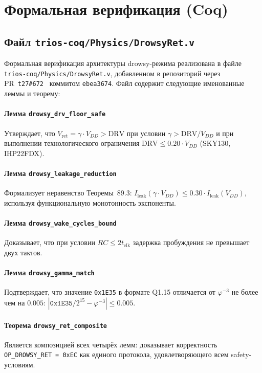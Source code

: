 \section{Формальная верификация (Coq)}
\label{sec:glava89-coq}

\subsection{Файл \texttt{trios-coq/Physics/DrowsyRet.v}}

Формальная верификация архитектуры drowsy-режима
реализована в файле \texttt{trios-coq/Physics/DrowsyRet.v},
добавленном в репозиторий через PR~\texttt{t27\#672}~\cite{t27-672}
коммитом \texttt{ebea3674}.
Файл содержит следующие именованные леммы и теорему:

\paragraph{Лемма \texttt{drowsy\_drv\_floor\_safe}}
Утверждает, что $V_\mathrm{ret} = \gamma \cdot V_{DD} > \mathrm{DRV}$
при условии $\gamma > \mathrm{DRV}/V_{DD}$
и при выполнении технологического ограничения
$\mathrm{DRV} \leq 0.20 \cdot V_{DD}$ (SKY130, IHP22FDX).

\paragraph{Лемма \texttt{drowsy\_leakage\_reduction}}
Формализует неравенство Теоремы~89.3:
$I_\mathrm{leak}(\gamma \cdot V_{DD}) \leq 0.30 \cdot I_\mathrm{leak}(V_{DD})$,
используя функциональную монотонность экспоненты.

\paragraph{Лемма \texttt{drowsy\_wake\_cycles\_bound}}
Доказывает, что при условии $RC \leq 2 t_\mathrm{clk}$
задержка пробуждения не превышает двух тактов.

\paragraph{Лемма \texttt{drowsy\_gamma\_match}}
Подтверждает, что значение \texttt{0x1E35} в формате Q1.15
отличается от $\varphi^{-3}$ не более чем на $0.005$:
$|\mathtt{0x1E35}/2^{15} - \varphi^{-3}| \leq 0.005$.

\paragraph{Теорема \texttt{drowsy\_ret\_composite}}
Является композицией всех четырёх лемм:
доказывает корректность \texttt{OP\_DROWSY\_RET}~\texttt{=~0xEC}
как единого протокола, удовлетворяющего всем safety-условиям.

